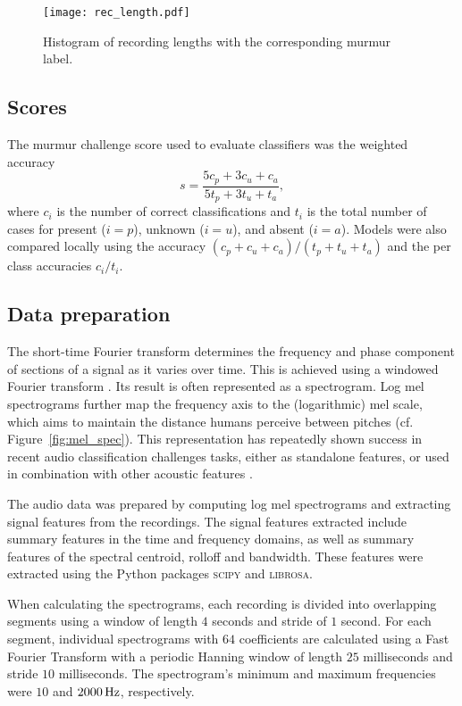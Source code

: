\documentclass[twocolumn]{cinc}
\begin{document}
\begin{figure}[htbp]
\texttt{[image: rec\_length.pdf]}
\caption{Histogram of recording lengths with the corresponding murmur label.}
\label{fig:rec_length}
\end{figure}



\subsection{Scores} The murmur challenge score used to evaluate classifiers was the weighted accuracy 
\begin{equation}\label{eq:accu}
    s = \frac{5c_p + 3c_u + c_a}{5t_p + 3t_u + t_a},
\end{equation}
where $c_i$ is the number of correct classifications and $t_i$ is the total number of cases for present ($i=p$), unknown ($i=u$), and absent ($i=a$). Models were also compared locally using the accuracy $({c_p + c_u + c_a})/({t_p + t_u + t_a})$ and the per class accuracies ${c_i}/{t_i}$.






\subsection{Data preparation} 

The short-time Fourier transform determines the frequency and phase component of sections of a signal as it varies over time. This is achieved using a windowed Fourier transform \cite{SEJDIC2009153}. Its result is often represented as a spectrogram. Log mel spectrograms further map the frequency axis to the (logarithmic) mel scale, which aims to maintain the distance humans perceive between pitches (cf. Figure~\ref{fig:mel_spec}). This representation has repeatedly shown success in recent audio classification challenges tasks, either as standalone features, or used in combination with other acoustic features \cite{Challenge,dcasetask42021}.

The audio data was prepared by computing log mel spectrograms and extracting signal features from the recordings. The signal features extracted include summary features in the time and frequency domains, as well as summary features of the spectral centroid, rolloff and bandwidth. These features were extracted using the Python packages \textsc{scipy} and \textsc{librosa}. 

When calculating the spectrograms, each recording is divided into overlapping segments using a window of length $4$ seconds and stride of $1$ second. For each segment, individual spectrograms with $64$ coefficients are calculated using a Fast Fourier Transform with a periodic Hanning window of length $25$ milliseconds and stride $10$ milliseconds. The spectrogram's minimum and maximum frequencies were $10$ and $2000\,\rm{Hz}$, respectively.
\end{document}
